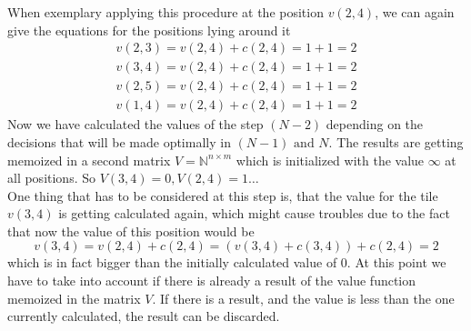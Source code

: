 \documentclass[conference]{IEEEtran}
\begin{document}
When exemplary applying this procedure at the position $v(2,4)$, we can again give the equations for the positions lying around it
\begin{align}
v(2,3) = v(2,4) + c(2,4) = 1 + 1 = 2\\
v(3,4) = v(2,4) + c(2,4) = 1 + 1 = 2\\
v(2,5) = v(2,4) + c(2,4) = 1 + 1 = 2\\
v(1,4) = v(2,4) + c(2,4) = 1 + 1 = 2
\end{align}
Now we have calculated the values of the step $(N-2)$ depending on the decisions that will be made optimally in $(N-1) \text{ and } N$. The results are getting memoized in a second matrix $V = \mathbb{N}^{n \times m}$ which is initialized with the value $\infty$ at all positions. So $V(3,4) = 0, V(2,4)=1 \dots$\\ 
One thing that has to be considered at this step is, that the value for the tile $v(3,4)$ is getting calculated again, which might cause troubles due to the fact that now the value of this position would be
\begin{equation}
v(3,4) = v(2,4) + c(2,4) = (v(3,4) + c(3,4)) + c(2,4) = 2
\end{equation}
which is in fact bigger than the initially calculated value of $0$. At this point we have to take into account if there is already a result of the value function memoized in the matrix $V$. If there is a result, and the value is less than the one currently calculated, the result can be discarded.\\
\end{document}
